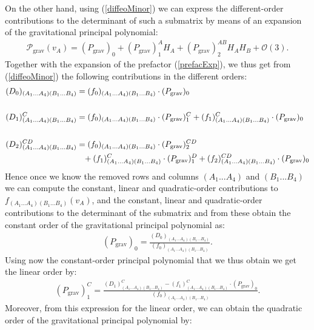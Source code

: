 On the other hand, using (\ref{diffeoMinor}) we can express the different-order contributions to the determinant of such a submatrix by means of an expansion of the gravitational principal polynomial:
\begin{align}
    \mathcal{P}_{\text{grav}}(v_A) = (P_{\text{grav}})_{0} + (P_{\text{grav}})^A_1 H_A+ (P_{\text{grav}})^{AB}_2 H_A H_B +\mathcal{O}(3).
\end{align}
Together with the expansion of the prefactor (\ref{prefacExp}), we thus get from (\ref{diffeoMinor}) the following contributions in the different orders:
\begin{align}\label{minorPoly}
    \begin{aligned}
    (D_0)_{(A_1...A_4)(B_1...B_4)}  &= (f_0)_{(A_1...A_4)(B_1...B_4)} \cdot (P_{\text{grav}})_0 \\
    \\
    (D_1)^C_{(A_1...A_4)(B_1...B_4)}  &= (f_0)_{(A_1...A_4)(B_1...B_4)} \cdot (P_{\text{grav}})^C_1 + (f_1)^C_{(A_1...A_4)(B_1...B_4)} \cdot (P_{\text{grav}})_0  \\
    \\
    (D_2)^{CD}_{(A_1...A_4)(B_1...B_4)}  &=  (f_0)_{(A_1...A_4)(B_1...B_4)} \cdot (P_{\text{grav}})_2^{CD} \\
     & \hphantom{=} +
     (f_1)^C_{(A_1...A_4)(B_1...B_4)} \cdot (P_{\text{grav}})_1^D +(f_2)^{CD}_{(A_1...A_4)(B_1...B_4)} \cdot (P_{\text{grav}})_0 
    \end{aligned}
\end{align}
Hence once we know the removed rows and columns $(A_1...A_4)$ and $(B_1...B_4)$ we can compute the constant, linear and quadratic-order contributions to $f_{(A_1...A_4)(B_1...B_4)}(v_A)$, and the constant, linear and quadratic-order contributions to the determinant of the submatrix and from these obtain the constant order of the gravitational principal polynomial as:
\begin{align}\label{POLY1}
(P_{\text{grav}})_0 = \frac{(D_0)_{(A_1...A_4)(B_1...B_4)}}{(f_0)_{(A_1...A_4)(B_1...B_4)}}.
\end{align}
Using now the constant-order principal polynomial that we thus obtain we get the linear order by:
\begin{align}\label{POLY2}
    (P_{\text{grav}})^C_1= \frac{(D_1)^C_{(A_1...A_4)(B_1...B_4)} - (f_1)^C_{(A_1...A_4)(B_1...B_4)} \cdot (P_{\text{grav}})_0}{(f_0)_{(A_1...A_4)(B_1...B_4)}}.
\end{align}
Moreover, from this expression for the linear order, we can obtain the quadratic order of the gravitational principal polynomial by:
